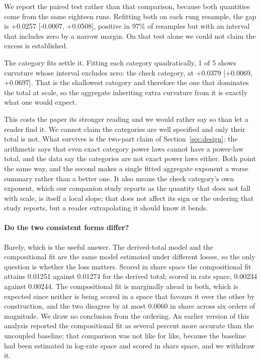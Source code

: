 \documentclass[11pt]{article}
\begin{document}
We report the paired test rather than that comparison, because both quantities come
from the same eighteen runs. Refitting both on each rung resample, the gap is
+0.0257 [-0.0007, +0.0508], positive in
97\% of resamples but with an interval that includes zero by a
narrow margin. On that test alone we could not claim the excess is established.

The category fits settle it. Fitting each category quadratically,
1 of 5 shows curvature whose interval
excludes zero: the check category, at +0.0379
[+0.0069, +0.0697]. That is the shallowest category and
therefore the one that dominates the total at scale, so the aggregate inheriting
extra curvature from it is exactly what one would expect.

This costs the paper its stronger reading and we would rather say so than let a
reader find it. We cannot claim the categories are well specified and only their
total is not. What survives is the two-part claim of Section~\ref{sec:design}: the
arithmetic says that even exact category power laws cannot have a power-law total,
and the data say the categories are not exact power laws either. Both point the same
way, and the second makes a single fitted aggregate exponent a worse summary rather
than a better one. It also means the check category's own exponent, which our
companion study reports as the quantity that does not fall with scale, is itself a
local slope; that does not affect its sign or the ordering that study reports, but a
reader extrapolating it should know it bends.

\paragraph{Do the two consistent forms differ?}
Barely, which is the useful answer. The derived-total model and the compositional
fit are the same model estimated under different losses, so the only question is
whether the loss matters. Scored in share space the compositional fit attains
0.01251 against 0.01274 for the derived total; scored
in rate space, 0.00234 against 0.00244. The compositional
fit is marginally ahead in both, which is expected since neither is being scored in
a space that favours it over the other by construction, and the two disagree by at
most 0.0060 in share across six orders of magnitude. We draw no
conclusion from the ordering. An earlier version of this analysis reported the
compositional fit as several percent more accurate than the uncoupled baseline; that
comparison was not like for like, because the baseline had been estimated in
log-rate space and scored in share space, and we withdraw it.
\end{document}
